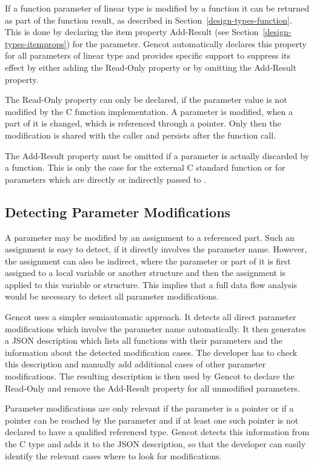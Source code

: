 If a function parameter of linear type is modified by a function it can be returned as part of the function result, 
as described in Section~\ref{design-types-function}. This is done by declaring the item property Add-Result 
(see Section~\ref{design-types-itemprops}) for the parameter. Gencot automatically declares this property for all 
parameters of linear type and provides specific support to suppress its effect by either adding the Read-Only 
property or by omitting the Add-Result property.

The Read-Only property can only be declared, if the parameter value is not modified by the C function implementation.
A parameter is modified, when a part of it is changed, which is referenced through a pointer. Only then the 
modification is shared with the caller and persists after the function call.

The Add-Result property must be omitted if a parameter is actually discarded by a function. This is only the case
for the external C standard function  or for parameters which are directly or indirectly passed to .

\subsection{Detecting Parameter Modifications}
\label{design-parmod-detect}

A parameter may be modified by an assignment to a referenced part. Such an assignment
is easy to detect, if it directly involves the parameter name. However, the assignment can also be indirect, where
the parameter or part of it is first assigned to a local variable or another structure and then the assignment
is applied to this variable or structure. This implies that a full data flow analysis would be necessary
to detect all parameter modifications.

Gencot uses a simpler semiautomatic approach. It detects all direct parameter modifications which involve the 
parameter name automatically. It then generates a JSON description which lists all functions with their parameters
and the information about the detected modification cases. The developer has to check this description and
manually add additional cases of other parameter modifications. The resulting description is then used by
Gencot to declare the Read-Only and remove the Add-Result property for all unmodified parameters.

Parameter modifications are only relevant if the parameter is a pointer or if a pointer can be reached by the parameter
and if at least one such pointer is not declared to have a  qualified referenced type. Gencot detects
this information from the C type and adds it to the JSON description, so that the developer can easily identify
the relevant cases where to look for modifications.

